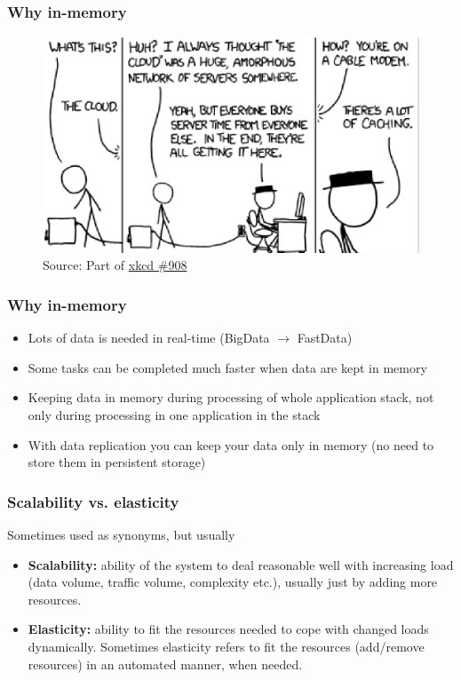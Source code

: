 \documentclass[10pt,utf8]{beamer}
\begin{document}
\begin{frame}
	\frametitle{Why in-memory}
	\begin{figure}
		\centering
		\includegraphics[width=12cm]{./img/xkcd_908.eps}
		\caption{\tiny{Source: Part of \href{http://xkcd.com/908/}{xkcd \#908}}}
	\end{figure}
\end{frame}

\begin{frame}
	\frametitle{Why in-memory}
	\begin{itemize}
	 \item Lots of data is needed in real-time (BigData $\rightarrow$ FastData)
	 \pause
	 \item Some tasks can be completed much faster when data are kept in memory
	 \pause
	 \item Keeping data in memory during processing of whole application stack, not only during processing in one application in the stack
	 \pause
	 \item With data replication you can keep your data only in memory (no need to store them in persistent storage)
	\end{itemize}
\end{frame}

\begin{frame}
	\frametitle{Scalability vs. elasticity}
	Sometimes used as synonyms, but usually
	\begin{itemize}
		\item \textbf{Scalability:} ability of the system to deal reasonable well with increasing load (data volume, traffic volume, complexity etc.), usually just by adding more resources.
		\item \textbf{Elasticity:} ability to fit the resources needed to cope with changed loads dynamically. Sometimes elasticity refers to fit the resources (add/remove resources) in an automated manner, when needed. 
	\end{itemize}
\end{frame}
\end{document}
